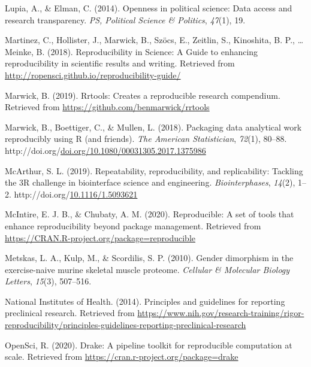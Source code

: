 \documentclass[12pt,twoside]{reedthesis}
\newenvironment{CSLReferences}%
  {}%
  {\par}
\begin{document}
\begin{CSLReferences}{1}{0}
\leavevmode\hypertarget{ref-lupia2014openness}{}%
Lupia, A., \& Elman, C. (2014). Openness in political science: Data access and research transparency. \emph{PS, Political Science \& Politics}, \emph{47}(1), 19.

\leavevmode\hypertarget{ref-r-opensci}{}%
Martinez, C., Hollister, J., Marwick, B., Szöcs, E., Zeitlin, S., Kinoshita, B. P., \ldots{} Meinke, B. (2018). {Reproducibility in Science: A Guide to enhancing reproducibility in scientific results and writing}. Retrieved from \url{http://ropensci.github.io/reproducibility-guide/}

\leavevmode\hypertarget{ref-R-rrtools}{}%
Marwick, B. (2019). Rrtools: Creates a reproducible research compendium. Retrieved from \url{https://github.com/benmarwick/rrtools}

\leavevmode\hypertarget{ref-marwick2018packaging}{}%
Marwick, B., Boettiger, C., \& Mullen, L. (2018). Packaging data analytical work reproducibly using {R} (and friends). \emph{The American Statistician}, \emph{72}(1), 80--88. http://doi.org/\href{https://doi.org/doi.org/10.1080/00031305.2017.1375986}{doi.org/10.1080/00031305.2017.1375986}

\leavevmode\hypertarget{ref-engineering-reproducibility}{}%
McArthur, S. L. (2019). Repeatability, reproducibility, and replicability: Tackling the 3R challenge in biointerface science and engineering. \emph{Biointerphases}, \emph{14}(2), 1--2. http://doi.org/\href{https://doi.org/10.1116/1.5093621}{10.1116/1.5093621}

\leavevmode\hypertarget{ref-R-reproducible}{}%
McIntire, E. J. B., \& Chubaty, A. M. (2020). Reproducible: A set of tools that enhance reproducibility beyond package management. Retrieved from \url{https://CRAN.R-project.org/package=reproducible}

\leavevmode\hypertarget{ref-metskas2010gender}{}%
Metskas, L. A., Kulp, M., \& Scordilis, S. P. (2010). Gender dimorphism in the exercise-naive murine skeletal muscle proteome. \emph{Cellular \& Molecular Biology Letters}, \emph{15}(3), 507--516.

\leavevmode\hypertarget{ref-bio-principles}{}%
National Institutes of Health. (2014). Principles and guidelines for reporting preclinical research. Retrieved from \url{https://www.nih.gov/research-training/rigor-reproducibility/principles-guidelines-reporting-preclinical-research}

\leavevmode\hypertarget{ref-R-drake}{}%
OpenSci, R. (2020). Drake: A pipeline toolkit for reproducible computation at scale. Retrieved from \url{https://cran.r-project.org/package=drake}


\end{CSLReferences}
\end{document}
